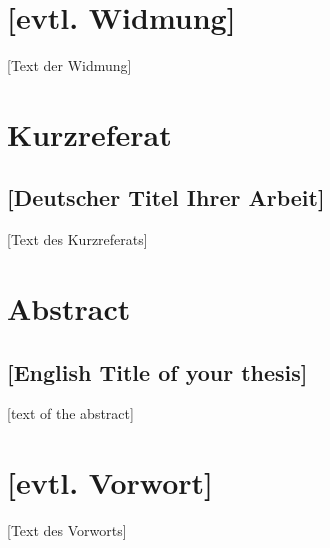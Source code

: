 \documentclass[a4paper,12pt,twoside]{scrreprt}
\begin{document}
\newpage
\section*{[evtl. Widmung]}   %

[Text der Widmung]

\newpage
\section*{Kurzreferat}

\subsection*{[Deutscher Titel Ihrer Arbeit]}

[Text des Kurzreferats]
\vspace{0.5cm}


\newpage
\section*{Abstract}
\subsection*{[English Title of your thesis]}

[text of the abstract]
\vspace{0.5cm}


\newpage
\section*{[evtl. Vorwort]}   %

[Text des Vorworts]


\cleardoublepage   %
\tableofcontents

\clearpage
{}
{}
\listoffigures
\end{document}
